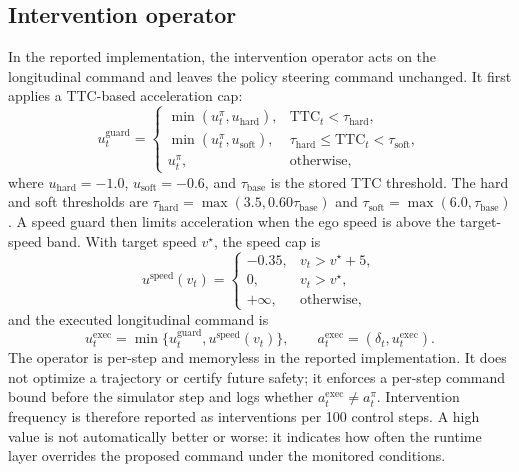 \documentclass[pdflatex,sn-mathphys-ay]{sn-jnl}
\begin{document}
\subsection{Intervention operator}\label{sec_guard_operator}
In the reported implementation, the intervention operator acts on the longitudinal command and leaves the policy steering command unchanged. It first applies a TTC-based acceleration cap:
\begin{equation}
u_t^{\mathrm{guard}}=
\begin{cases}
\min(u_t^\pi,u_{\mathrm{hard}}), & \mathrm{TTC}_t<\tau_{\mathrm{hard}},\\
\min(u_t^\pi,u_{\mathrm{soft}}), & \tau_{\mathrm{hard}}\leq \mathrm{TTC}_t<\tau_{\mathrm{soft}},\\
u_t^\pi, & \mathrm{otherwise},
\end{cases}
\end{equation}
where $u_{\mathrm{hard}}=-1.0$, $u_{\mathrm{soft}}=-0.6$, and $\tau_{\mathrm{base}}$ is the stored TTC threshold. The hard and soft thresholds are $\tau_{\mathrm{hard}}=\max(3.5,0.60\tau_{\mathrm{base}})$ and $\tau_{\mathrm{soft}}=\max(6.0,\tau_{\mathrm{base}})$. A speed guard then limits acceleration when the ego speed is above the target-speed band. With target speed $v^\star$, the speed cap is
\begin{equation}
u^{\mathrm{speed}}(v_t)=
\begin{cases}
-0.35, & v_t>v^\star+5,\\
0, & v_t>v^\star,\\
+\infty, & \mathrm{otherwise},
\end{cases}
\end{equation}
and the executed longitudinal command is
\begin{equation}
u_t^{\mathrm{exec}}=\min\{u_t^{\mathrm{guard}},u^{\mathrm{speed}}(v_t)\},\qquad
a_t^{\mathrm{exec}}=(\delta_t,u_t^{\mathrm{exec}}).
\end{equation}
The operator is per-step and memoryless in the reported implementation. It does not optimize a trajectory or certify future safety; it enforces a per-step command bound before the simulator step and logs whether $a_t^{\mathrm{exec}}\ne a_t^\pi$. Intervention frequency is therefore reported as interventions per 100 control steps. A high value is not automatically better or worse: it indicates how often the runtime layer overrides the proposed command under the monitored conditions.
\end{document}
